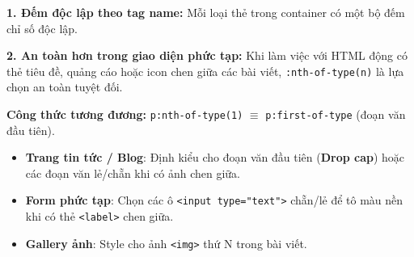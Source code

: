 \documentclass[11pt,oneside]{book}
\newcommand{\thd}[1]{\textcolor{white}{\textbf{\strut #1}}}
\newcommand{\codeinline}[1]{\textcolor{accentOrange}{\texttt{#1}}}
\newcommand{\term}[1]{\textbf{\textcolor{primaryBlue}{#1}}}
\begin{document}
\begin{prettyTableBox}
\sffamily\small
{}
\end{prettyTableBox}

\begin{warnBox}
\textbf{1. Đếm độc lập theo tag name:} Mỗi loại thẻ trong container có một bộ đếm chỉ số độc lập.
\par\vspace{4pt}
\textbf{2. An toàn hơn trong giao diện phức tạp:} Khi làm việc với HTML động có thẻ tiêu đề, quảng cáo hoặc icon chen giữa các bài viết, \codeinline{:nth-of-type(n)} là lựa chọn an toàn tuyệt đối.
\end{warnBox}

\begin{tipBox}
\textbf{Công thức tương đương:} \codeinline{p:nth-of-type(1)} $\equiv$ \codeinline{p:first-of-type} (đoạn văn đầu tiên).
\end{tipBox}

\begin{conceptBox}
\begin{itemize}[leftmargin=1.5em, itemsep=3pt, parsep=0pt]
    \item \textbf{Trang tin tức / Blog}: Định kiểu cho đoạn văn đầu tiên (\term{Drop cap}) hoặc các đoạn văn lẻ/chẵn khi có ảnh chen giữa.
    \item \textbf{Form phức tạp}: Chọn các ô \codeinline{<input type="text">} chẵn/lẻ để tô màu nền khi có thẻ \codeinline{<label>} chen giữa.
    \item \textbf{Gallery ảnh}: Style cho ảnh \codeinline{<img>} thứ N trong bài viết.
\end{itemize}
\end{conceptBox}
\end{document}
